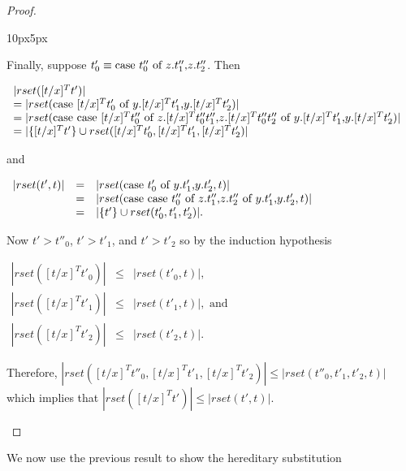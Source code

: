 \begin{proof}
\begin{changemargin}{10px}{5px}
\begin{itemize}
  Finally, suppose $t'_0 \equiv \mbox{case}\ t''_0\ \text{of}\ z\text{.}t''_1\text{,}z\text{.}t''_2$.  Then 
  \vspace{-20px}
  \begin{center}
    \begin{math}
      \begin{array}{lll}
        |rset([t/x]^T t')| \\
        = |rset(\mbox{case}\ [t/x]^T t'_0\ \text{of}\ y\text{.}[t/x]^T t'_1\text{,}y\text{.}[t/x]^T t'_2)|\\
        = |rset(\mbox{case}\ \mbox{case}\ [t/x]^T t''_0\ \text{of}\ z\text{.}[t/x]^T t''_0 t''_1\text{,}z\text{.}[t/x]^T t''_0 t''_2\ \text{of}\ y\text{.}[t/x]^T t'_1\text{,}y\text{.}[t/x]^T t'_2)|\\
        = |\{[t/x]^T t'\} \cup rset([t/x]^T t'_0, [t/x]^T t'_1, [t/x]^T t'_2)|
      \end{array}
    \end{math}
  \end{center}
  and
  \begin{center}
    \begin{math}
      \begin{array}{lll}
        |rset(t',t)| & = & |rset(\mbox{case}\ t'_0\ \text{of}\ y\text{.}t'_1\text{,}y\text{.}t'_2,t)|\\
        & = & |rset(\mbox{case}\ \mbox{case}\ t''_0\ \text{of}\ z\text{.}t''_1\text{,}z\text{.}t''_2\ \text{of}\ y\text{.}t'_1\text{,}y\text{.}t'_2,t)|\\
        & = & |\{t'\} \cup rset(t'_0, t'_1,t'_2)|.
      \end{array}
    \end{math}
  \end{center}
  Now $t' > t''_0$, $t' > t'_1$, and $t' > t'_2$ so by the induction hypothesis
  \begin{center}
    \begin{math}
      \begin{array}{lll}
        |rset([t/x]^T t'_0)| & \leq & |rset(t'_0,t)|,\\
        |rset([t/x]^T t'_1)|  & \leq & |rset(t'_1,t)|, \text{ and }\\
        |rset([t/x]^T t'_2)|  & \leq & |rset(t'_2,t)|.
      \end{array}
    \end{math}
  \end{center}
  Therefore, $|rset([t/x]^T t''_0, [t/x]^T t'_1, [t/x]^T t'_2)| \leq |rset(t''_0, t'_1, t'_2, t)|$
  which implies that $|rset([t/x]^T t')| \leq |rset(t',t)|$.  
\end{itemize}
\end{changemargin}
\end{proof}
\noindent
We now use the previous result to show the hereditary substitution
